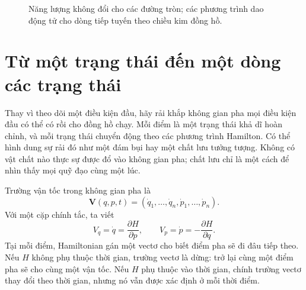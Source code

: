 \begin{figure}[htbp]\centering
  \caption{Năng lượng không đổi cho các đường tròn; các phương trình dao động tử cho dòng tiếp tuyến theo chiều kim đồng hồ.}\end{figure}

\begin{classroomqa}\end{classroomqa}

\section{Từ một trạng thái đến một dòng các trạng thái}

Thay vì theo dõi một điều kiện đầu, hãy rải khắp không gian pha mọi điều kiện đầu có thể có rồi cho đồng hồ chạy. Mỗi điểm là một trạng thái khả dĩ hoàn chỉnh, và mỗi trạng thái chuyển động theo các phương trình Hamilton. Có thể hình dung sự rải đó như một đám bụi hay một chất lưu tưởng tượng. Không có vật chất nào thực sự được đổ vào không gian pha; chất lưu chỉ là một cách để nhìn thấy mọi quỹ đạo cùng một lúc.

Trường vận tốc trong không gian pha là \begin{equation}
  \mathbf V(q,p,t)
  =
  (\dot q_1,\ldots,\dot q_n,\dot p_1,\ldots,\dot p_n).
  \label{eq:l7-phase-velocity}
\end{equation} Với một cặp chính tắc, ta viết \begin{equation}
  V_q=\dot q=\frac{\partial H}{\partial p},
  \qquad
  V_p=\dot p=-\frac{\partial H}{\partial q}.
  \label{eq:l7-phase-components}
\end{equation} Tại mỗi điểm, Hamiltonian gán một vectơ cho biết điểm pha sẽ đi đâu tiếp theo. Nếu \(H\) không phụ thuộc thời gian, trường vectơ là dừng: trở lại cùng một điểm pha sẽ cho cùng một vận tốc. Nếu \(H\) phụ thuộc vào thời gian, chính trường vectơ thay đổi theo thời gian, nhưng nó vẫn được xác định ở mỗi thời điểm.

